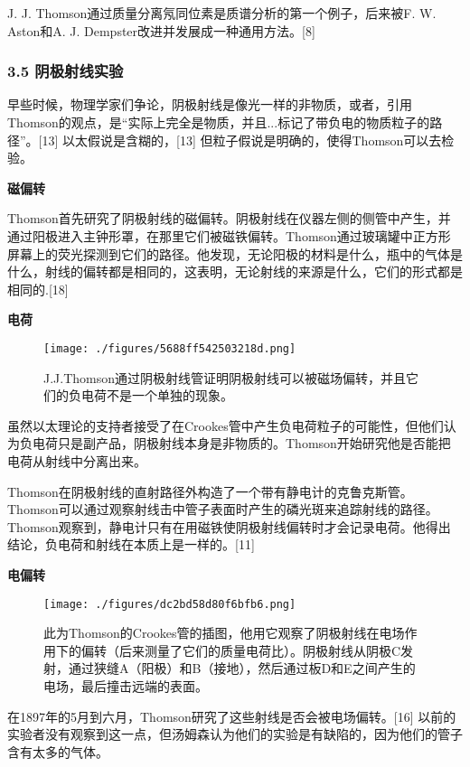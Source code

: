 J. J. Thomson通过质量分离氖同位素是质谱分析的第一个例子，后来被F. W. Aston和A. J. Dempster改进并发展成一种通用方法。[8]

\subsubsection{3.5 阴极射线实验}
早些时候，物理学家们争论，阴极射线是像光一样的非物质，或者，引用Thomson的观点，是“实际上完全是物质，并且...标记了带负电的物质粒子的路径”。[13] 以太假说是含糊的，[13] 但粒子假说是明确的，使得Thomson可以去检验。

\textbf{磁偏转}

Thomson首先研究了阴极射线的磁偏转。阴极射线在仪器左侧的侧管中产生，并通过阳极进入主钟形罩，在那里它们被磁铁偏转。Thomson通过玻璃罐中正方形屏幕上的荧光探测到它们的路径。他发现，无论阳极的材料是什么，瓶中的气体是什么，射线的偏转都是相同的，这表明，无论射线的来源是什么，它们的形式都是相同的.[18]

\textbf{电荷}

\begin{figure}[ht]
\centering
\texttt{[image: ./figures/5688ff542503218d.png]}
\caption{J.J.Thomson通过阴极射线管证明阴极射线可以被磁场偏转，并且它们的负电荷不是一个单独的现象。} \label{fig_Joseph_2}
\end{figure}
虽然以太理论的支持者接受了在Crookes管中产生负电荷粒子的可能性，但他们认为负电荷只是副产品，阴极射线本身是非物质的。Thomson开始研究他是否能把电荷从射线中分离出来。

Thomson在阴极射线的直射路径外构造了一个带有静电计的克鲁克斯管。Thomson可以通过观察射线击中管子表面时产生的磷光斑来追踪射线的路径。Thomson观察到，静电计只有在用磁铁使阴极射线偏转时才会记录电荷。他得出结论，负电荷和射线在本质上是一样的。[11]

\textbf{电偏转}

\begin{figure}[ht]
\centering
\texttt{[image: ./figures/dc2bd58d80f6bfb6.png]}
\caption{此为Thomson的Crookes管的插图，他用它观察了阴极射线在电场作用下的偏转（后来测量了它们的质量电荷比）。阴极射线从阴极C发射，通过狭缝A（阳极）和B（接地），然后通过板D和E之间产生的电场，最后撞击远端的表面。} \label{fig_Joseph_3}
\end{figure}
在1897年的5月到六月，Thomson研究了这些射线是否会被电场偏转。[16] 以前的实验者没有观察到这一点，但汤姆森认为他们的实验是有缺陷的，因为他们的管子含有太多的气体。

